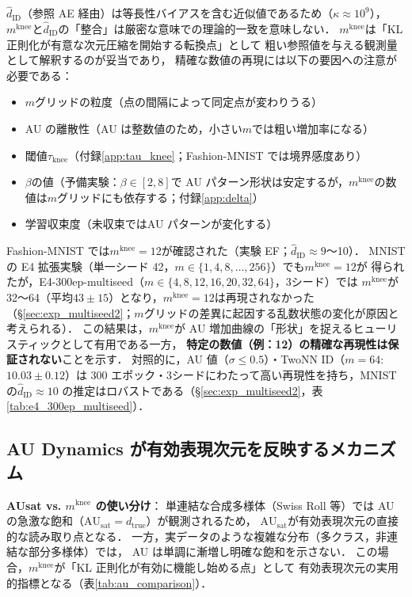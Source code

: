 \documentclass[11pt,a4paper]{jsarticle}
\newcommand{\dtrue}{d_{\mathrm{true}}}
\newcommand{\kap}{\kappa}
\newcommand{\AUsat}{\mathrm{AU}_{\mathrm{sat}}}
\newcommand{\mknee}{m^{\mathrm{knee}}}
\begin{document}
$\hat{d}_\mathrm{ID}$（参照 AE 経由）は等長性バイアスを含む近似値であるため（$\kap \approx 10^9$），
$\mknee$と$\hat{d}_\mathrm{ID}$の「整合」は厳密な意味での理論的一致を意味しない．
$\mknee$は「KL 正則化が有意な次元圧縮を開始する転換点」として
粗い参照値を与える観測量として解釈するのが妥当であり，
精確な数値の再現には以下の要因への注意が必要である：
\begin{itemize}
  \item $m$グリッドの粒度（点の間隔によって同定点が変わりうる）
  \item AU の離散性（AU は整数値のため，小さい$m$では粗い増加率になる）
  \item 閾値$\tau_{\mathrm{knee}}$（付録\ref{app:tau_knee}；Fashion-MNIST では境界感度あり）
  \item $\beta$の値（予備実験：$\beta \in [2, 8]$で AU パターン形状は安定するが，$\mknee$の数値は$m$グリッドにも依存する；付録\ref{app:delta}）
  \item 学習収束度（未収束ではAU パターンが変化する）
\end{itemize}

Fashion-MNIST では$\mknee = 12$が確認された（実験 EF；$\hat{d}_\mathrm{ID} \approx 9$〜10）．
MNIST の E4 拡張実験（単一シード 42，$m \in \{1, 4, 8, \ldots, 256\}$）でも$\mknee = 12$が
得られたが，E4-300ep-multiseed（$m \in \{4, 8, 12, 16, 20, 32, 64\}$，3シード）では
$\mknee$が 32〜64（平均$43 \pm 15$）となり，$\mknee = 12$は再現されなかった
（§\ref{sec:exp_multiseed2}；$m$グリッドの差異に起因する乱数状態の変化が原因と考えられる）．
この結果は，$\mknee$が AU 増加曲線の「形状」を捉えるヒューリスティックとして有用である一方，
\textbf{特定の数値（例：12）の精確な再現性は保証されない}ことを示す．
対照的に，AU 値（$\sigma \leq 0.5$）・TwoNN ID（$m=64$: $10.03 \pm 0.12$）は
300 エポック・3シードにわたって高い再現性を持ち，MNIST の$\hat{d}_\mathrm{ID} \approx 10$
の推定はロバストである（§\ref{sec:exp_multiseed2}，表\ref{tab:e4_300ep_multiseed}）．

\subsection{AU Dynamics が有効表現次元を反映するメカニズム}\label{sec:disc_au_dynamics}

\textbf{AUsat vs. $\mknee$ の使い分け}：
単連結な合成多様体（Swiss Roll 等）では AU の急激な飽和（$\AUsat = \dtrue$）が観測されるため，
$\AUsat$が有効表現次元の直接的な読み取り点となる．
一方，実データのような複雑な分布（多クラス，非連結な部分多様体）では，
AU は単調に漸増し明確な飽和を示さない．
この場合，$\mknee$が「KL 正則化が有効に機能し始める点」として
有効表現次元の実用的指標となる（表\ref{tab:au_comparison}）．
\end{document}
